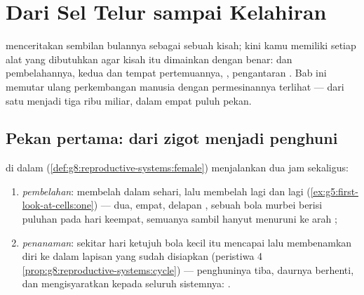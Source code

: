 \chapter{Dari Sel Telur sampai Kelahiran}\label{ch:g8:from-egg-to-birth}

 menceritakan sembilan
bulannya sebagai sebuah kisah; kini kamu memiliki setiap alat
yang dibutuhkan agar kisah itu dimainkan dengan benar: 
dan pembelahannya, kedua  dan tempat pertemuannya,
, pengantaran . Bab ini memutar ulang
perkembangan manusia dengan permesinannya terlihat --- dari
satu  menjadi tiga ribu miliar, dalam empat puluh pekan.

\section{Pekan pertama: dari zigot menjadi penghuni}

\begin{proposition}\label{prop:g8:from-egg-to-birth:firstweek}
 di dalam 
(\cref{def:g8:reproductive-systems:female}) menjalankan dua
jam sekaligus:
\begin{enumerate}
  \item \emph{pembelahan}:  membelah dalam sehari,
        lalu membelah lagi dan lagi
        (\cref{ex:g5:first-look-at-cells:one}) --- dua,
        empat, delapan , sebuah bola murbei berisi
        puluhan  pada hari keempat, semuanya sambil
        hanyut menuruni  ke arah ;
  \item \emph{penanaman}: sekitar hari ketujuh bola kecil
        itu mencapai  lalu membenamkan diri ke dalam
        lapisan yang sudah disiapkan (peristiwa 4
        \cref{prop:g8:reproductive-systems:cycle}) ---
        penghuninya tiba, daurnya berhenti, dan 
        mengisyaratkan kepada seluruh sistemnya: .
\end{enumerate}
\end{proposition}
\admitted

